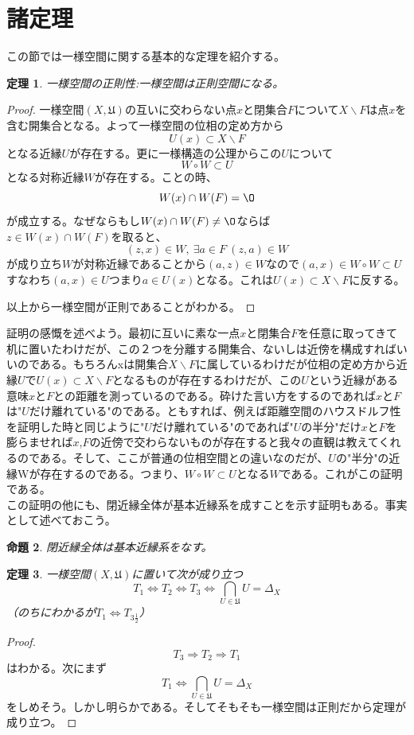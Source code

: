 \documentclass[leqno]{jsarticle}
\newtheorem{thm}{定理}
\newtheorem{prop}[thm]{命題}
\begin{document}
\section{諸定理}
この節では一様空間に関する基本的な定理を紹介する。
\begin{thm}一様空間の正則性:一様空間は正則空間になる。
\end{thm}
\begin{proof}一様空間$(X,\mathfrak{U})$の互いに交わらない点$x$と閉集合$F$について$X\backslash F$は点$x$を含む開集合となる。よって一様空間の位相の定め方から
\[
U(x)\subset X\backslash F
\]となる近縁$U$が存在する。更に一様構造の公理からこの$U$について
\[
W\circ W\subset U
\]となる対称近縁$W$が存在する。ことの時、
\[
W(x)\cap W(F)=\O
\]が成立する。なぜならもし$W(x)\cap W(F)\neq \O$ならば$z\in W(x)\cap W(F)を取ると、$
\[
(z,x)\in W,\ \exists a\in F\ (z,a)\in W
\]が成り立ち$W$が対称近縁であることから$(a,z)\in W$なので$(a,x)\in W\circ W\subset U$すなわち$(a,x)\in U$つまり$a\in U(x)$となる。これは$U(x)\subset X\backslash F$に反する。\par
以上から一様空間が正則であることがわかる。
\end{proof}
証明の感慨を述べよう。最初に互いに素な一点$x$と閉集合$F$を任意に取ってきて机に置いたわけだが、この２つを分離する開集合、ないしは近傍を構成すればいいのである。もちろんxは開集合$X\backslash F$に属しているわけだが位相の定め方から近縁$U$で$U(x)\subset X\backslash F$となるものが存在するわけだが、この$U$という近縁がある意味$x$と$F$との距離を測っているのである。砕けた言い方をするのであれば$x$と$F$は"$U$だけ離れている"のである。ともすれば、例えば距離空間のハウスドルフ性を証明した時と同じように"$U$だけ離れている"のであれば"$U$の半分"だけ$x$と$F$を膨らませれば$x$,$F$の近傍で交わらないものが存在すると我々の直観は教えてくれるのである。そして、ここが普通の位相空間との違いなのだが、$U$の"半分"の近縁Wが存在するのである。つまり、$W\circ W\subset U$となる$W$である。これがこの証明である。\\ 
この証明の他にも、閉近縁全体が基本近縁系を成すことを示す証明もある。事実として述べておこう。
\begin{prop}
閉近縁全体は基本近縁系をなす。
\end{prop}
\begin{thm}
一様空間$(X,\mathfrak{U})$に置いて次が成り立つ
\[
T_{1}\Leftrightarrow T_{2}\Leftrightarrow T_{3}\Leftrightarrow \bigcap_{U\in \mathfrak{U}}U=\Delta_{X} 
\]
（のちにわかるが$T_{1}\Leftrightarrow T_{3\frac{1}{2}}$）
\end{thm}
\begin{proof}
\[
T_{3}\Rightarrow T_{2}\Rightarrow T_{1}
\]
はわかる。次にまず
\[
T_{1}\Leftrightarrow \bigcap_{U\in \mathfrak{U}}U=\Delta_{X} 
\]をしめそう。しかし明らかである。そしてそもそも一様空間は正則だから定理が成り立つ。
\end{proof}
\end{document}
